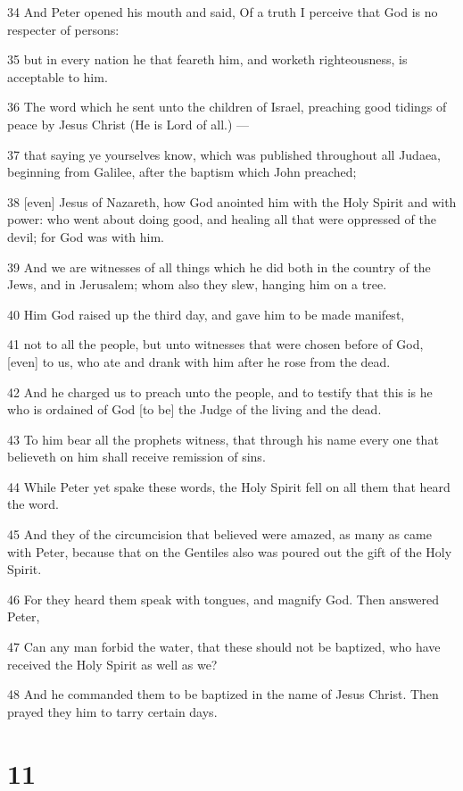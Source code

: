 \par 34 And Peter opened his mouth and said, Of a truth I perceive that God is no respecter of persons:
\par 35 but in every nation he that feareth him, and worketh righteousness, is acceptable to him.
\par 36 The word which he sent unto the children of Israel, preaching good tidings of peace by Jesus Christ (He is Lord of all.) —
\par 37 that saying ye yourselves know, which was published throughout all Judaea, beginning from Galilee, after the baptism which John preached;
\par 38 [even] Jesus of Nazareth, how God anointed him with the Holy Spirit and with power: who went about doing good, and healing all that were oppressed of the devil; for God was with him.
\par 39 And we are witnesses of all things which he did both in the country of the Jews, and in Jerusalem; whom also they slew, hanging him on a tree.
\par 40 Him God raised up the third day, and gave him to be made manifest,
\par 41 not to all the people, but unto witnesses that were chosen before of God, [even] to us, who ate and drank with him after he rose from the dead.
\par 42 And he charged us to preach unto the people, and to testify that this is he who is ordained of God [to be] the Judge of the living and the dead.
\par 43 To him bear all the prophets witness, that through his name every one that believeth on him shall receive remission of sins.
\par 44 While Peter yet spake these words, the Holy Spirit fell on all them that heard the word.
\par 45 And they of the circumcision that believed were amazed, as many as came with Peter, because that on the Gentiles also was poured out the gift of the Holy Spirit.
\par 46 For they heard them speak with tongues, and magnify God. Then answered Peter,
\par 47 Can any man forbid the water, that these should not be baptized, who have received the Holy Spirit as well as we?
\par 48 And he commanded them to be baptized in the name of Jesus Christ. Then prayed they him to tarry certain days.

\chapter{11}

